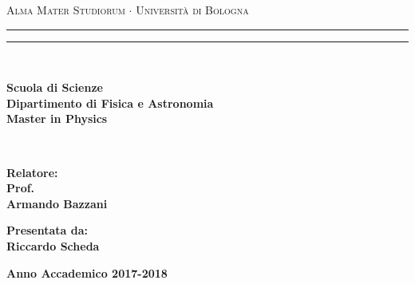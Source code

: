 \begin{titlepage}

\begin{center}
{{\Large{\textsc{Alma Mater Studiorum $\cdot$ Universit\`a di Bologna}}}} 
\rule[0.1cm]{15.8cm}{0.1mm}
\rule[0.5cm]{15.8cm}{0.6mm}
\\\vspace{3mm}

{\small{\bf Scuola di Scienze \\ 
Dipartimento di Fisica e Astronomia\\
Master in Physics}}

\end{center}

\vspace{23mm}
\begin{center}
\vspace{3mm}
{\LARGE{\bf }}
\vspace{3mm}
{\LARGE{\bf }}
\\
\end{center}
\vspace{40mm}
\par
\noindent
\begin{minipage}[t]{0.47\textwidth}
{\large{\bf Relatore:\\
Prof.\\
Armando Bazzani}}
\end{minipage}
\hfill
\begin{minipage}[t]{0.47\textwidth}\raggedleft
{\large{\bf Presentata da:\\
Riccardo Scheda}}
\end{minipage}
\vspace{30mm}
\begin{center}
{\large{\bf Anno Accademico 2017-2018}}
\end{center}
\end{titlepage}


